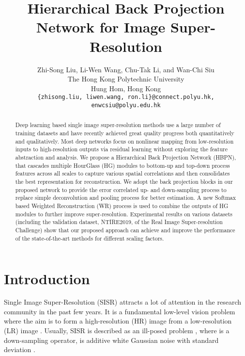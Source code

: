 \documentclass[10pt,twocolumn,letterpaper]{article}
\begin{document}
\title{Hierarchical Back Projection Network for Image Super-Resolution}

\author{Zhi-Song Liu, Li-Wen Wang, Chu-Tak Li, and Wan-Chi Siu\\
The Hong Kong Polytechnic University\\
Hung Hom, Hong Kong\\
{\tt\small \{zhisong.liu, liwen.wang, ron.li\}@connect.polyu.hk, enwcsiu@polyu.edu.hk}
}

\maketitle
\thispagestyle{empty}

\begin{abstract}
   Deep learning based single image super-resolution methods use a large number of training datasets and have recently achieved great quality progress both quantitatively and qualitatively. Most deep networks focus on nonlinear mapping from low-resolution inputs to high-resolution outputs via residual learning without exploring the feature abstraction and analysis. We propose a Hierarchical Back Projection Network (HBPN), that cascades multiple HourGlass (HG) modules to bottom-up and top-down process features across all scales to capture various spatial correlations and then consolidates the best representation for reconstruction. We adopt the back projection blocks in our proposed network to provide the error correlated up- and down-sampling process to replace simple deconvolution and pooling process for better estimation. A new Softmax based Weighted Reconstruction (WR) process is used to combine the outputs of HG modules to further improve super-resolution. Experimental results on various datasets (including the validation dataset, NTIRE2019, of the Real Image Super-resolution Challenge) show that our proposed approach can achieve and improve the performance of the state-of-the-art methods for different scaling factors.
\end{abstract}

\section{Introduction}

Single Image Super-Resolution (SISR) attracts a lot of attention in the research community in the past few years. It is a fundamental low-level vision problem where the aim is to form a high-resolution (HR) image  from a low-resolution (LR) image . Usually, SISR is described as an ill-posed problem , where  is a down-sampling operator,  is additive white Gaussian noise with standard deviation . 
\end{document}

